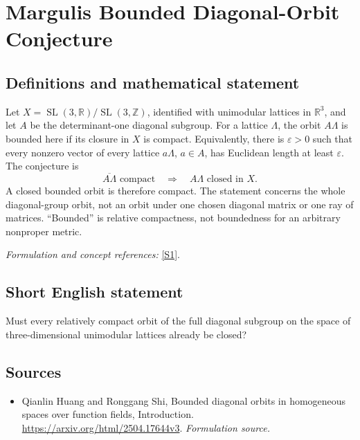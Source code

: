 \documentclass[11pt]{article}
\begin{document}
\section*{\texorpdfstring{Margulis Bounded Diagonal-Orbit Conjecture}{Margulis Bounded Diagonal-Orbit Conjecture}}\label{393}
\subsection{Definitions and mathematical statement}
Let $X=\operatorname{SL}(3,{\mathbb{R}})/\operatorname{SL}(3,{\mathbb{Z}})$, identified with unimodular lattices in ${\mathbb{R}}^3$, and let $A$ be the determinant-one diagonal subgroup. For a lattice $\Lambda$, the orbit $A\Lambda$ is bounded here if its closure in $X$ is compact. Equivalently, there is ${\varepsilon}>0$ such that every nonzero vector of every lattice $a\Lambda$, $a\in A$, has Euclidean length at least ${\varepsilon}$. The conjecture is
\[
 \overline{A\Lambda}\text{ compact}\quad\Longrightarrow\quad
 A\Lambda\text{ closed in }X.
\]
A closed bounded orbit is therefore compact. The statement concerns the whole diagonal-group orbit, not an orbit under one chosen diagonal matrix or one ray of matrices. ``Bounded'' is relative compactness, not boundedness for an arbitrary nonproper metric.
\par\smallskip\textit{Formulation and concept references:} \href{https://arxiv.org/html/2504.17644v3}{[S1]}.

\subsection{Short English statement}
Must every relatively compact orbit of the full diagonal subgroup on the space of three-dimensional unimodular lattices already be closed?
\subsection{Sources}
\begin{itemize}
\item[S1]Qianlin Huang and Ronggang Shi, Bounded diagonal orbits in homogeneous spaces over function fields, Introduction.
\url{https://arxiv.org/html/2504.17644v3}.
\textit{Formulation source.}
\end{itemize}
\end{document}
